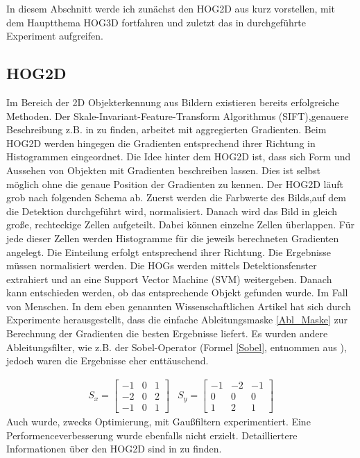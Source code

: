 In diesem Abschnitt werde ich zunächst den HOG2D aus \cite{dalal2005histograms} kurz vorstellen, mit dem Hauptthema HOG3D fortfahren und zuletzt das in \cite{scherer2010histograms} durchgeführte Experiment aufgreifen.

\subsection{HOG2D}
Im Bereich der 2D Objekterkennung aus Bildern existieren bereits erfolgreiche Methoden. Der Skale-Invariant-Feature-Transform Algorithmus (SIFT),genauere Beschreibung z.B. in \cite{Priese15}
zu finden, arbeitet mit aggregierten Gradienten. Beim HOG2D werden hingegen die Gradienten entsprechend
ihrer Richtung in Histogrammen eingeordnet.
\newline
Die Idee hinter dem HOG2D ist, dass sich Form und Aussehen von Objekten mit Gradienten beschreiben lassen.
Dies ist selbst möglich ohne die genaue Position der Gradienten zu kennen. Der HOG2D läuft grob nach folgenden Schema ab. Zuerst werden die Farbwerte des Bilds,auf dem die Detektion durchgeführt wird, normalisiert. Danach wird das Bild in gleich große, rechteckige Zellen aufgeteilt. Dabei können einzelne Zellen überlappen. Für jede dieser Zellen werden Histogramme für die jeweils berechneten Gradienten angelegt. Die Einteilung erfolgt entsprechend ihrer Richtung. Die Ergebnisse müssen normalisiert werden. Die HOGs werden mittels Detektionsfenster extrahiert und an eine Support Vector Machine (SVM) weitergeben. Danach kann entschieden werden, ob das entsprechende Objekt gefunden wurde. Im Fall von \cite{dalal2005histograms} Menschen. In dem eben genannten Wissenschaftlichen Artikel hat sich durch Experimente herausgestellt, dass die einfache Ableitungsmaske \ref{Abl_Maske} zur Berechnung der Gradienten die besten Ergebnisse liefert. 
Es wurden andere Ableitungsfilter, wie z.B. der Sobel-Operator (Formel \ref{Sobel}, entnommen aus \cite{Priese15}), jedoch waren die Ergebnisse eher enttäuschend. 

\begin{align}
\label{Sobel}
	S_x =	\begin{bmatrix}
				-1 & 0 & 1 \\
				-2 & 0 & 2 \\
				-1 & 0 & 1 
			\end{bmatrix}  &  
	S_y =	\begin{bmatrix}
				-1 & -2 & -1 \\
				 0 & 0 &   0 \\
				 1 & 2 &   1 
			\end{bmatrix}	
\end{align}
Auch wurde, zwecks Optimierung, mit Gaußfiltern experimentiert. Eine Performenceverbesserung wurde ebenfalls nicht erzielt. 
Detailliertere Informationen über den HOG2D sind in \cite{dalal2005histograms} zu finden.

